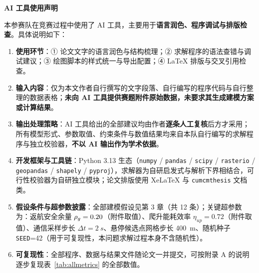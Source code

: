 \newpage
{}
{}
\begin{center}
	{\bfseries AI 工具使用声明}
\end{center}

本参赛队在竞赛过程中使用了 AI 工具，主要用于\textbf{语言润色、程序调试与排版检查}。具体说明如下：

\begin{enumerate}[label=\arabic*.]
	\item \textbf{使用环节}：① 论文文字的语言润色与结构梳理；② 求解程序的语法查错与调试建议；③ 绘图脚本的样式统一与导出配置；④ LaTeX 排版与交叉引用检查。

	\item \textbf{输入内容}：仅为本文作者自行撰写的文字段落、自行编写的程序代码与自行整理的数据表格；\textbf{未向 AI 工具提供赛题附件原始数据，未要求其生成建模方案或计算结果}。

	\item \textbf{输出处理策略}：AI 工具给出的全部建议均由作者\textbf{逐条人工复核}后方才采用；所有模型形式、参数取值、约束条件与数值结果均来自本队自行编写的求解程序与独立校验器，\textbf{不以 AI 输出作为学术依据}。

	\item \textbf{开发框架与工具链}：Python 3.13 生态（\texttt{numpy} / \texttt{pandas} / \texttt{scipy} / \texttt{rasterio} / \texttt{geopandas} / \texttt{shapely} / \texttt{pyproj}），求解器为自研启发式与解析下界相结合，可行性校验器为自研独立模块；论文排版使用 XeLaTeX 与 \texttt{cumcmthesis} 文档类。

	\item \textbf{假设条件与超参数披露}：全部建模假设见第 3 章（共 12 条）；关键超参数为：返航安全余量 $\rho_{g}=0.20$（附件取值）、爬升能耗效率 $\eta_{up}=0.72$（附件取值）、通信采样步长 $\Delta t=\SI{2}{s}$、悬停候选点网格步长 \SI{400}{m}、随机种子 \texttt{SEED}=42（用于可复现性，本问题求解过程本身不含随机性）。

	\item \textbf{可复现性}：全部程序、数据与结果文件随论文一并提交，可按附录 A 的说明逐步复现表~\ref{tab:allmetrics} 的全部数值。
\end{enumerate}
